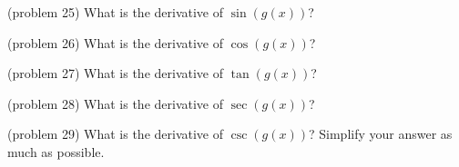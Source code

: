 \documentclass[handout]{ximera}
\begin{document}
\begin{problem}(problem 25)
What is the derivative of $\sin(g(x))$?
\begin{multipleChoice}
\end{multipleChoice}
\end{problem}

\begin{problem}(problem 26)
What is the derivative of $\cos(g(x))$?
\begin{multipleChoice}
\end{multipleChoice}
\end{problem}

\begin{problem}(problem 27)
What is the derivative of $\tan(g(x))$?
\begin{multipleChoice}
  \end{multipleChoice}  
\end{problem} 

\begin{problem}(problem 28)
What is the derivative of $\sec(g(x))$?
\begin{multipleChoice}
  \end{multipleChoice}  
\end{problem}

\begin{problem}(problem 29)
What is the derivative of $\csc(g(x))$?
Simplify your answer as much as possible.
\begin{multipleChoice}
  \end{multipleChoice} 
\end{problem}
\end{document}

